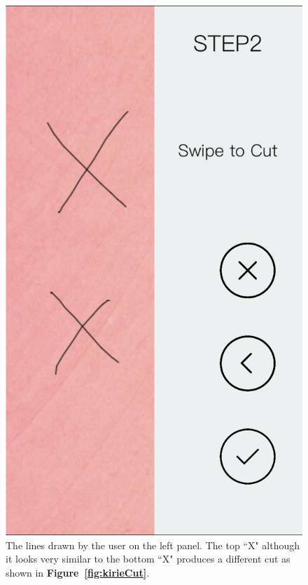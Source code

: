 \documentclass[11pt]{article}
\begin{document}
                \begin{figure}[!ht]
                        \begin{minipage}{0.45\textwidth}
                            \centering \includegraphics[width=0.7\linewidth]{Images/kirieXs}
                            \caption{The lines drawn by the user on the left panel. The top ``X" although it looks very similar to the bottom ``X" produces a different cut as shown in  \textbf{Figure~\ref{fig:kirieCut}}.\\\\}
                            \label{fig:kirieXs}
                        \end{minipage}\hfill
                        \begin{minipage}{0.45\textwidth}
                            \centering

\end{minipage}
\end{figure}
\end{document}

